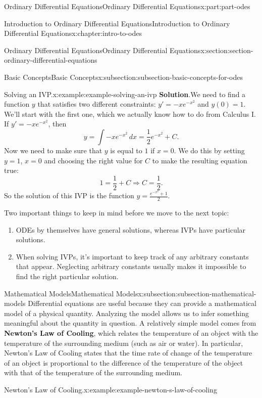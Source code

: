 \documentclass[twoside,10pt,]{book}
\newcommand{\blocktitlefont}{\relax}
\newcommand{\terminology}[1]{\textbf{#1}}
\numberwithin{equation}{part}
\begin{document}
\begin{partptx}{Ordinary Differential Equations}{}{Ordinary Differential Equations}{}{}{x:part:part-odes}
\begin{chapterptx}{Introduction to Ordinary Differential Equations}{}{Introduction to Ordinary Differential Equations}{}{}{x:chapter:intro-to-odes}
\begin{sectionptx}{Ordinary Differential Equations}{}{Ordinary Differential Equations}{}{}{x:section:section-ordinary-differential-equations}
\begin{subsectionptx}{Basic Concepts}{}{Basic Concepts}{}{}{x:subsection:subsection-basic-concepts-for-odes}
\begin{example}{Solving an IVP.}{x:example:example-solving-an-ivp}
\noindent\textbf{\blocktitlefont Solution}.\hypertarget{g:solution:idp105548816143904}{}\quad{}We need to find a function \(y\) that satisfies two different constraints: \(y' = -xe^{-x^{2}}\) and \(y(0)=1\). We'll start with the first one, which we actually know how to do from Calculus I. If \(y' = -xe^{-x^{2}}\), then%
\begin{equation*}
y = \int -xe^{-x^{2}}\,dx = \frac{1}{2}e^{-x^{2}}+C.
\end{equation*}
Now we need to make sure that \(y\) is equal to \(1\) if \(x=0\). We do this by setting \(y=1\), \(x=0\) and choosing the right value for \(C\) to make the resulting equation true:%
\begin{equation*}
1 = \frac{1}{2} + C \Rightarrow C = \frac{1}{2}.
\end{equation*}
So the solution of this IVP is the function \(y = \frac{e^{-x^{2}}+1}{2}\).%
\end{example}
Two important things to keep in mind before we move to the next topic:%
\begin{enumerate}
\item{}ODEs by themselves have general solutions, whereas IVPs have particular solutions.%
\item{}When solving IVPs, it's important to keep track of any arbitrary constants that appear. Neglecting arbitrary constants usually makes it impossible to find the right particular solution.%
\end{enumerate}
%
\end{subsectionptx}
%
%
\typeout{************************************************}
\typeout{************************************************}
%
\begin{subsectionptx}{Mathematical Models}{}{Mathematical Models}{}{}{x:subsection:subsection-mathematical-models}
Differential equations are useful because they can provide a mathematical model of a physical quantity. Analyzing the model allows us to infer something meaningful about the quantity in question. A relatively simple model comes from \terminology{Newton's Law of Cooling}, which relates the temperature of an object with the temperature of the surrounding medium (such as air or water). In particular, Newton's Law of Cooling states that the time rate of change of the temperature of an object is proportional to the difference of the temperature of the object with that of the temperature of the surrounding medium.%
\begin{example}{Newton's Law of Cooling.}{x:example:example-newton-s-law-of-cooling}%

\end{example}
\end{subsectionptx}
\end{sectionptx}
\end{chapterptx}
\end{partptx}
\end{document}
